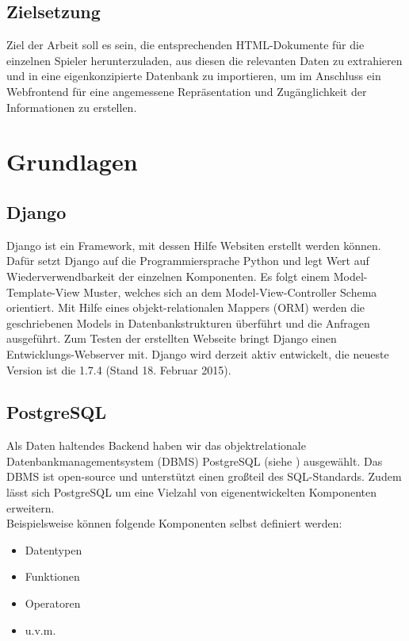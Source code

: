 \documentclass[12pt,a4paper]{scrreprt}
\begin{document}
\section{Zielsetzung}
Ziel der Arbeit soll es sein, die entsprechenden HTML-Dokumente für die einzelnen Spieler herunterzuladen, aus diesen die relevanten Daten zu extrahieren und in eine eigenkonzipierte Datenbank zu importieren, um im Anschluss ein Webfrontend für eine angemessene Repräsentation und Zugänglichkeit der Informationen zu erstellen.
\newpage

\chapter{Grundlagen}
\section{Django}
\label{Django}
Django ist ein Framework, mit dessen Hilfe Websiten erstellt werden können. Dafür setzt Django auf die Programmiersprache Python und legt Wert auf Wiederverwendbarkeit der einzelnen Komponenten. Es folgt einem Model-Template-View Muster, welches sich an dem Model-View-Controller Schema orientiert. Mit Hilfe eines objekt-relationalen Mappers (ORM) werden die geschriebenen Models in Datenbankstrukturen überführt und die Anfragen ausgeführt. Zum Testen der erstellten Webseite bringt Django einen Entwicklungs-Webserver mit. Django wird derzeit aktiv entwickelt, die neueste Version ist die 1.7.4 (Stand 18. Februar 2015).

\section{PostgreSQL}
Als Daten haltendes Backend haben wir das objektrelationale Datenbankmanagementsystem (DBMS) PostgreSQL (siehe \cite{PostgreSQL2015}) ausgewählt. Das DBMS ist open-source und unterstützt einen großteil des SQL-Standards. Zudem lässt sich PostgreSQL um eine Vielzahl von eigenentwickelten Komponenten erweitern.\\

\noindent Beispielsweise können folgende Komponenten selbst definiert werden:
\begin{itemize}
\item Datentypen
\item Funktionen
\item Operatoren 
\item u.v.m.
\end{itemize}
\end{document}
